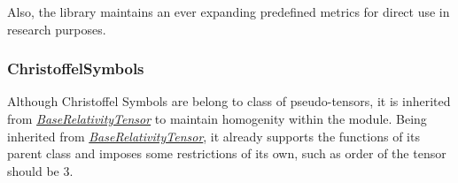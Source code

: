 \documentclass{aastex63}
\begin{document}
Also, the library maintains an ever expanding predefined metrics for direct use in research purposes.






\subsubsection{ChristoffelSymbols}\label{subsubsec:chl}

Although Christoffel Symbols are belong to class of pseudo-tensors, it is inherited from \hyperref[subsec:BaseRelativityTensor]{\textit{BaseRelativityTensor}} to maintain homogenity within the module. Being inherited from  \hyperref[subsec:BaseRelativityTensor]{\textit{BaseRelativityTensor}}, it already supports the functions of its parent class and imposes some restrictions of its own, such as order of the tensor should be 3.
\end{document}

